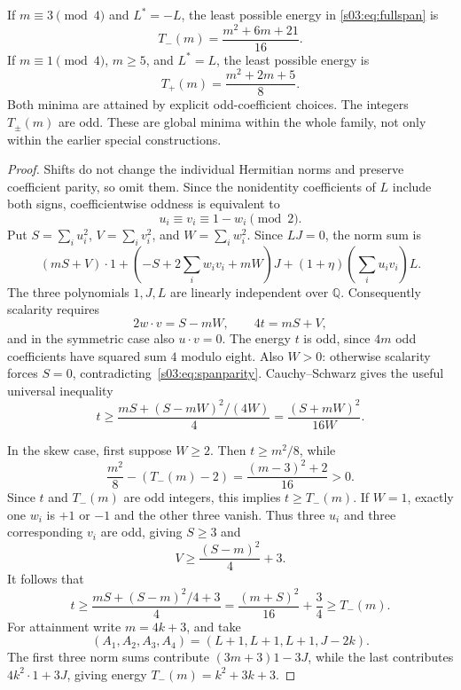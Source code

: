 \begin{theorem}\label{s03:thm:spanfloor}
If $m\equiv3\pmod4$ and $L^*=-L$, the least possible energy in
\eqref{s03:eq:fullspan} is
\[
 T_-(m)=\frac{m^2+6m+21}{16}.
\]
If $m\equiv1\pmod4$, $m\ge5$, and $L^*=L$, the least possible energy is
\[
 T_+(m)=\frac{m^2+2m+5}{8}.
\]
Both minima are attained by explicit odd-coefficient choices. The
integers $T_\pm(m)$ are odd. These are global minima within the whole
family, not only within the earlier special constructions.
\end{theorem}
\begin{proof}
Shifts do not change the individual Hermitian norms and preserve
coefficient parity, so omit them. Since the nonidentity coefficients
of $L$ include both signs, coefficientwise oddness is equivalent to
\begin{equation}\label{s03:eq:spanparity}
 u_i\equiv v_i\equiv1-w_i\pmod2.
\end{equation}
Put $S=\sum_i u_i^2$, $V=\sum_i v_i^2$, and $W=\sum_i w_i^2$.
Since $LJ=0$, the norm sum is
\[
 (mS+V)\cdot1+
 \left(-S+2\sum_iw_iv_i+mW\right)J
 +(1+\eta)\left(\sum_i u_iv_i\right)L.
\]
The three polynomials $1,J,L$ are linearly independent over $\mathbb Q$.
Consequently scalarity requires
\begin{equation}\label{s03:eq:spanconditions}
 2w\mathbin{\cdot}v=S-mW,\qquad 4t=mS+V,
\end{equation}
and in the symmetric case also $u\mathbin{\cdot}v=0$.
The energy $t$ is odd, since $4m$ odd coefficients have squared sum
$4$ modulo eight. Also $W>0$: otherwise scalarity forces $S=0$,
contradicting~\eqref{s03:eq:spanparity}. Cauchy--Schwarz gives the useful
universal inequality
\begin{equation}\label{s03:eq:spanCS}
 t\ge\frac{mS+(S-mW)^2/(4W)}4
   =\frac{(S+mW)^2}{16W}.
\end{equation}

In the skew case, first suppose $W\ge2$. Then $t\ge m^2/8$, while
\[
 \frac{m^2}{8}-(T_-(m)-2)
 =\frac{(m-3)^2+2}{16}>0.
\]
Since $t$ and $T_-(m)$ are odd integers, this implies $t\ge T_-(m)$.
If $W=1$, exactly one $w_i$ is $+1$ or $-1$ and the other three
vanish. Thus three $u_i$ and three corresponding $v_i$ are odd,
giving $S\ge3$ and
\[
 V\ge\frac{(S-m)^2}{4}+3.
\]
It follows that
\[
 t\ge\frac{mS+(S-m)^2/4+3}{4}
 =\frac{(m+S)^2}{16}+\frac34
 \ge T_-(m).
\]
For attainment write $m=4k+3$, and take
\[
 (A_1,A_2,A_3,A_4)=(L+1,L+1,L+1,J-2k).
\]
The first three norm sums contribute $(3m+3)1-3J$, while the last
contributes $4k^2\cdot1+3J$, giving energy $T_-(m)=k^2+3k+3$.


\end{proof}
